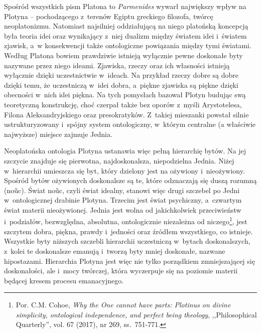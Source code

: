 Spośród wszystkich pism Platona to \textit{Parmenides} wywarł największy wpływ na Plotyna -- pochodzącego z~terenów Egiptu greckiego filozofa, twórcę neoplatonizmu. Natomiast najsilniej oddziałującą na niego platońską koncepcją była teoria idei oraz wynikający z~niej dualizm między światem idei i~światem zjawisk, a~w konsekwencji także ontologiczne powiązania między tymi światami. Według Platona bowiem prawdziwie istnieją wyłącznie pewne doskonałe byty nazywane przez niego ideami. Zjawiska, rzeczy oraz ich własności istnieją wyłącznie dzięki uczestnictwie w~ideach. Na przykład rzeczy dobre są dobre dzięki temu, że uczestniczą w~idei dobra, a~piękne zjawiska są piękne dzięki obecności w~nich idei piękna. Na tych pomysłach bazował Plotyn budując swą teoretyczną konstrukcję, choć czerpał także bez oporów z~myśli Arystotelesa, Filona Aleksandryjskiego oraz presokratyków. Z~takiej mieszanki powstał silnie ustrukturyzowany i~spójny system ontologiczny, w~którym centralne (a właściwie najwyższe) miejsce zajmuje Jednia.

Neoplatońska ontologia Plotyna ustanawia więc pełną hierarchię bytów. Na jej szczycie znajduje się pierwotna, najdoskonalsza, niepodzielna Jednia. Niżej w~hierarchii umieszcza się byt, który dzielony jest na ożywiony i~nieożywiony. Spośród bytów ożywionych doskonalsze są te, które odznaczają się duszą rozumną (\textgreek{no\~uc}). Świat \textgreek{no\~uc}, czyli świat idealny, stanowi więc drugi szczebel po Jedni w~ontologicznej drabinie Plotyna. Trzecim jest świat psychiczny, a~czwartym świat materii nieożywionej. Jednia jest wolna od jakichkolwiek przeciwieństw i~podziałów, bezwzględna, absolutna, ontologicznie niezależna od niczego\footnote{Por. C.M. Cohoe, \textit{Why the One cannot have parts: Plotinus on divine simplicity, ontological independence, and perfect being theology}, ,,Philosophical Quarterly'', vol. 67 (2017), nr 269, ss.~751-771.}, jest szczytem dobra, piękna, prawdy i~jedności oraz źródłem wszystkiego, co istnieje. Wszystkie byty niższych szczebli hierarchii uczestniczą w~bytach doskonalszych, z~kolei te doskonalsze emanują i~tworzą byty mniej doskonałe, nazwane hipostazami. Hierarchia Plotyna jest więc nie tylko porządkiem zmniejszającej się doskonałości, ale i~mocy twórczej, która wyczerpuje się na poziomie materii będącej kresem procesu emanacyjnego.

